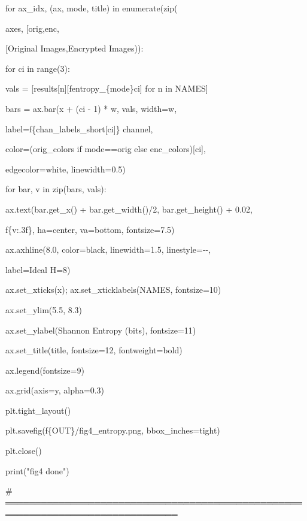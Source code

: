 for ax\_idx, (ax, mode, title) in enumerate(zip(

axes, {[}\textquotesingle orig\textquotesingle,\textquotesingle enc\textquotesingle{]},

{[}\textquotesingle Original Images\textquotesingle,\textquotesingle Encrypted Images\textquotesingle{]})):

for ci in range(3):

vals = {[}results{[}n{]}{[}f\textquotesingle entropy\_\{mode\}\textquotesingle{]}{[}ci{]} for n in NAMES{]}

bars = ax.bar(x + (ci - 1) * w, vals, width=w,

label=f\textquotesingle\{chan\_labels\_short{[}ci{]}\} channel\textquotesingle,

color=(orig\_colors if mode==\textquotesingle orig\textquotesingle{} else enc\_colors){[}ci{]},

edgecolor=\textquotesingle white\textquotesingle, linewidth=0.5)

for bar, v in zip(bars, vals):

ax.text(bar.get\_x() + bar.get\_width()/2, bar.get\_height() + 0.02,

f\textquotesingle\{v:.3f\}\textquotesingle, ha=\textquotesingle center\textquotesingle, va=\textquotesingle bottom\textquotesingle, fontsize=7.5)

ax.axhline(8.0, color=\textquotesingle black\textquotesingle, linewidth=1.5, linestyle=\textquotesingle-\/-\textquotesingle,

label=\textquotesingle Ideal H=8\textquotesingle)

ax.set\_xticks(x); ax.set\_xticklabels(NAMES, fontsize=10)

ax.set\_ylim(5.5, 8.3)

ax.set\_ylabel(\textquotesingle Shannon Entropy (bits)\textquotesingle, fontsize=11)

ax.set\_title(title, fontsize=12, fontweight=\textquotesingle bold\textquotesingle)

ax.legend(fontsize=9)

ax.grid(axis=\textquotesingle y\textquotesingle, alpha=0.3)

plt.tight\_layout()

plt.savefig(f\textquotesingle\{OUT\}/fig4\_entropy.png\textquotesingle, bbox\_inches=\textquotesingle tight\textquotesingle)

plt.close()

print("fig4 done")

\# ═══════════════════════════════════════════════════════════════════════════════

